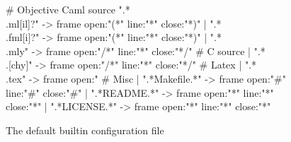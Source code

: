 \documentclass{article}
\begin{document}
\begin{figure}
\begin{center}
\begin{boxedverbatim}

# Objective Caml source
  ".*\\.ml[il]?" -> frame open:"(*" line:"*" close:"*)"
| ".*\\.fml[i]?" -> frame open:"(*" line:"*" close:"*)"
| ".*\\.mly"     -> frame open:"/*" line:"*" close:"*/"
# C source
| ".*\\.[chy]"    -> frame open:"/*" line:"*" close:"*/"
# Latex
| ".*\\.tex"     -> frame open:"%
# Misc
| ".*Makefile.*" -> frame open:"#"  line:"#" close:"#"
| ".*README.*"   -> frame open:"*"  line:"*" close:"*"
| ".*LICENSE.*"  -> frame open:"*"  line:"*" close:"*"
\end{boxedverbatim}
\end{center}
  \caption{The default builtin configuration file}
  \label{figure:config}
\end{figure}
\end{document}
